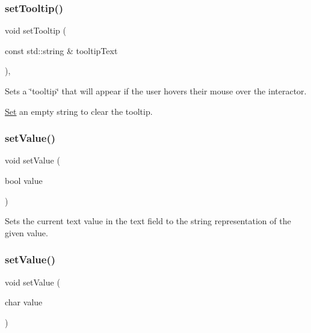 \subsubsection{\texorpdfstring{set\+Tooltip()}{setTooltip()}}
{\footnotesize\ttfamily void set\+Tooltip (\begin{DoxyParamCaption}\item[{const std\+::string \&}]{tooltip\+Text }\end{DoxyParamCaption})\hspace{0.3cm}{\ttfamily [virtual]}, {\ttfamily [inherited]}}



Sets a \char`\"{}tooltip\char`\"{} that will appear if the user hovers their mouse over the interactor. 

\mbox{\hyperlink{classSet}{Set}} an empty string to clear the tooltip. \mbox{\label{classGTextField_ae803b3348fa7076308d852bbdeea0d74}} 
\subsubsection{\texorpdfstring{set\+Value()}{setValue()}\hspace{0.1cm}{\footnotesize\ttfamily [1/5]}}
{\footnotesize\ttfamily void set\+Value (\begin{DoxyParamCaption}\item[{bool}]{value }\end{DoxyParamCaption})\hspace{0.3cm}{\ttfamily [virtual]}}



Sets the current text value in the text field to the string representation of the given value. 

\mbox{\label{classGTextField_aeefe59b3d414b657838869ce084cb0e2}} 
\subsubsection{\texorpdfstring{set\+Value()}{setValue()}\hspace{0.1cm}{\footnotesize\ttfamily [2/5]}}
{\footnotesize\ttfamily void set\+Value (\begin{DoxyParamCaption}\item[{char}]{value }\end{DoxyParamCaption})\hspace{0.3cm}{\ttfamily [virtual]}}



